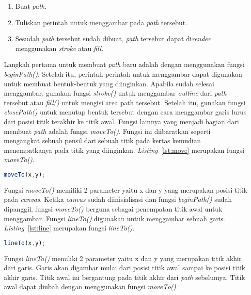 \begin{enumerate}
	\item Buat \textit{path}.
	\item Tuliskan perintah untuk menggambar pada \textit{path} tersebut.
	\item Sesudah \textit{path} tersebut sudah dibuat, \textit{path} tersebut dapat di\textit{render} menggunakan \textit{stroke} atau \textit{fill}.
\end{enumerate}

Langkah pertama untuk membuat \textit{path} baru adalah dengan menggunakan fungsi \textit{beginPath()}. Setelah itu, perintah-perintah untuk menggambar dapat digunakan untuk membuat bentuk-bentuk yang diinginkan. Apabila sudah selesai menggambar, gunakan fungsi \textit{stroke()} untuk menggambar \textit{outline} dari \textit{path} tersebut atau \textit{fill()} untuk mengisi area path tersebut. Setelah itu, gunakan fungsi \textit{closePath()} untuk menutup bentuk tersebut dengan cara menggambar garis lurus dari posisi titik terakhir ke titik awal. Fungsi lainnya yang menjadi bagian dari membuat \textit{path} adalah fungsi \textit{moveTo()}. Fungsi ini diibaratkan seperti mengangkat sebuah pensil dari sebuah titik pada kertas kemudian menempatkanya pada titik yang diinginkan. \textit{Listing}~\ref{lst:move} merupakan fungsi \textit{moveTo()}.

\begin{lstlisting}[language=Javascript, caption=Fungsi \textit{moveTo()}, label={lst:move}]
	moveTo(x,y);
\end{lstlisting}

Fungsi \textit{moveTo()} memiliki 2 parameter yaitu x dan y yang merupakan posisi titik pada \textit{canvas}. Ketika \textit{canvas} sudah diinisialisasi dan fungsi \textit{beginPath()} sudah dipanggil, fungsi \textit{moveTo()} berguna sebagai penempatan titik awal untuk menggambar. Fungsi \textit{lineTo()} digunakan untuk menggambar sebuah garis. \textit{Listing}~\ref{lst:line} merupakan fungsi \textit{lineTo()}.

\begin{lstlisting}[language=Javascript, caption=Fungsi \textit{lineTo()}, label={lst:line}]
	lineTo(x,y);
\end{lstlisting}

Fungsi \textit{lineTo()} memiliki 2 parameter yaitu x dan y yang merupakan titik akhir dari garis. Garis akan digambar mulai dari posisi titik awal sampai ke posisi titik akhir garis. Titik awal ini bergantung pada titik akhir dari \textit{path} sebelumya. Titik awal dapat diubah dengan menggunakan fungsi \textit{moveTo()}.\\

